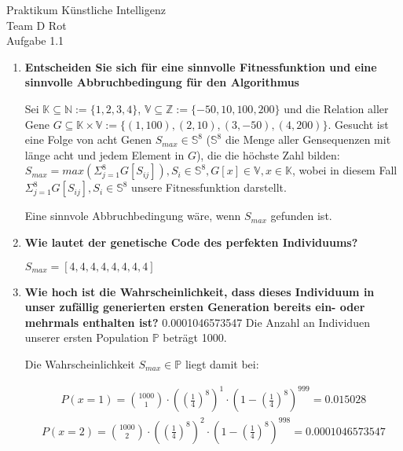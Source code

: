 \documentclass[12pt, twoside]{article}
\begin{document}
\begin{center}
  \Huge{Praktikum K\"unstliche Intelligenz} \\
  \huge{Team D Rot} \\
  \Large{Aufgabe 1.1} \\
\end{center}

\begin{enumerate}[label={\textbf{\alph*)}}]

  \item \textbf{Entscheiden Sie sich f\"ur eine sinnvolle
          Fitnessfunktion und eine sinnvolle
          Abbruchbedingung f\"ur den Algorithmus}

        Sei $\mathbb{K} \subseteq \mathbb{N}:=\{1,2,3,4\}$,
        $\mathbb{V} \subseteq \mathbb{Z} := \{-50,10,100,
        200\}$ und die Relation aller Gene $G \subseteq
        \mathbb{K} \times \mathbb{V} := \{(1,100), (2,10),
        (3, -50),(4, 200)\}$. Gesucht ist eine Folge von
        acht Genen $S_{max} \in \mathbb{S}^8$
        ($\mathbb{S}^8$ die Menge aller Gensequenzen mit
        l\"ange acht und jedem Element in $G$), die die
        h\"ochste Zahl bilden:
        $S_{max} = max(\Sigma_{j=1}^{8} G[S_{ij}]), S_{i}
        \in \mathbb{S}^8, G[x] \in \mathbb{V}, x \in
        \mathbb{K}$,
        wobei in diesem Fall
        $\Sigma_{j=1}^{8} G[S_{ij}],S_{i} \in \mathbb{S}^8$
        unsere Fitnessfunktion darstellt.

        Eine sinnvole Abbruchbedingung w\"are, wenn
        $S_{max}$ gefunden ist.

  \item \textbf{Wie lautet der genetische Code des
          perfekten Individuums?}

        $S_{max} = [4, 4, 4, 4, 4, 4, 4, 4]$

  \item \textbf{Wie hoch ist die Wahrscheinlichkeit, dass
          dieses Individuum in unser zuf\"allig generierten
          ersten Generation bereits ein- oder mehrmals
          enthalten ist?}
0.0001046573547
        Die Anzahl an Individuen unserer ersten Population
        $\mathbb{P}$ betr\"agt 1000.

        Die Wahrscheinlichkeit $S_{max} \in \mathbb{P}$
        liegt damit bei:

        \begin{align*}
         P(x=1) = \binom{1000}{1} \cdot ((\frac{1}{4})^8)^1 \cdot (1 - (\frac{1}{4})^8)^{999} = 0.015028
          \end{align*}
           \begin{align*}
          P(x=2) = \binom{1000}{2} \cdot ((\frac{1}{4})^8)^2 \cdot (1 - (\frac{1}{4})^8)^{998} = 0.0001046573547
        \end{align*}


\end{enumerate}
\end{document}
